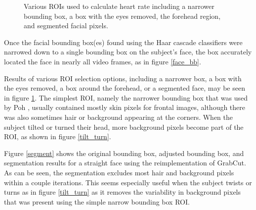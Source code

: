 \documentclass[10pt,twocolumn,letterpaper]{article}
\begin{document}
\begin{figure}
\begin{center}
\end{center}
\caption{Various ROIs used to calculate heart rate including a narrower bounding box, a box with the eyes removed, the forehead region, and segmented facial pixels.}
\label{roi}
\end{figure}

Once the facial bounding box(es) found using the Haar cascade classifiers were narrowed down to a single bounding box on the subject's face, the box accurately located the face in nearly all video frames, as in figure \ref{face_bb}. 

Results of various ROI selection options, including a narrower box, a box with the eyes removed, a box around the forehead, or a segmented face, may be seen in figure \ref{roi}. The simplest ROI, namely the narrower bounding box that was used by Poh \etal, usually contained mostly skin pixels for frontal images, although there was also sometimes hair or background appearing at the corners. When the subject tilted or turned their head, more background pixels become part of the ROI, as shown in figure \ref{tilt_turn}.

Figure \ref{segment} shows the original bounding box, adjusted bounding box, and segmentation results for a straight face using the reimplementation of GrabCut. As can be seen, the segmentation excludes most hair and background pixels within a couple iterations. This seems especially useful when the subject twists or turns as in figure \ref{tilt_turn} as it removes the variability in background pixels that was present using the simple narrow bounding box ROI.
\end{document}
